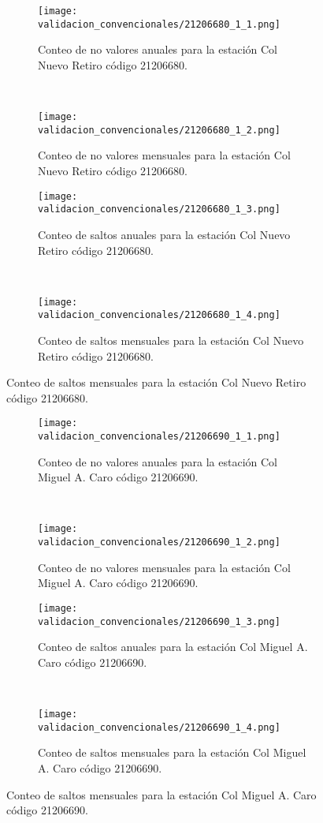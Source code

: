 \begin{figure}[H]\ContinuedFloat
\centering
	\begin{subfigure}[normla]{0.4\textwidth}
	\texttt{[image: validacion\_convencionales/21206680\_1\_1.png]}
		\caption{Conteo de no valores anuales para la estación Col Nuevo Retiro código 21206680.}
		\label{subfig:a1}
		\end{subfigure}
		~
    \begin{subfigure}[normla]{0.4\textwidth}
	\texttt{[image: validacion\_convencionales/21206680\_1\_2.png]}
		\caption{Conteo de no valores mensuales para la estación Col Nuevo Retiro código 21206680.}
		\label{subfig:a2}
		\end{subfigure}
		
    \begin{subfigure}[normla]{0.4\textwidth}
	\texttt{[image: validacion\_convencionales/21206680\_1\_3.png]}
		\caption{Conteo de saltos anuales para la estación Col Nuevo Retiro código 21206680.}
		\label{subfig:a1}
		\end{subfigure}
		~
    \begin{subfigure}[normla]{0.4\textwidth}
	\texttt{[image: validacion\_convencionales/21206680\_1\_4.png]}
		\caption{Conteo de saltos mensuales para la estación Col Nuevo Retiro código 21206680.}
		\label{subfig:a2}
		\end{subfigure}

	
\end{figure}
           
\begin{figure}[H]\ContinuedFloat
\centering
	\begin{subfigure}[normla]{0.4\textwidth}
	\texttt{[image: validacion\_convencionales/21206690\_1\_1.png]}
		\caption{Conteo de no valores anuales para la estación Col Miguel A. Caro código 21206690.}
		\label{subfig:a1}
		\end{subfigure}
		~
    \begin{subfigure}[normla]{0.4\textwidth}
	\texttt{[image: validacion\_convencionales/21206690\_1\_2.png]}
		\caption{Conteo de no valores mensuales para la estación Col Miguel A. Caro código 21206690.}
		\label{subfig:a2}
		\end{subfigure}
		
    \begin{subfigure}[normla]{0.4\textwidth}
	\texttt{[image: validacion\_convencionales/21206690\_1\_3.png]}
		\caption{Conteo de saltos anuales para la estación Col Miguel A. Caro código 21206690.}
		\label{subfig:a1}
		\end{subfigure}
		~
    \begin{subfigure}[normla]{0.4\textwidth}
	\texttt{[image: validacion\_convencionales/21206690\_1\_4.png]}
		\caption{Conteo de saltos mensuales para la estación Col Miguel A. Caro código 21206690.}
		\label{subfig:a2}
		\end{subfigure}

	
\end{figure}
           
